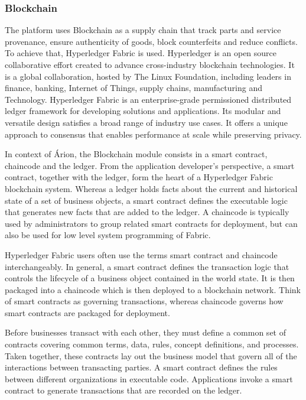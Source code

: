 \subsubsection{Blockchain}\label{sec:DataStorageBlockchain}
The platform uses Blockchain as a supply chain that track parts and service provenance, ensure authenticity of goods, block counterfeits and reduce conflicts. To achieve that, Hyperledger Fabric is used. Hyperledger is an open source collaborative effort created to advance cross-industry blockchain technologies. It is a global collaboration, hosted by The Linux Foundation, including leaders in finance, banking, Internet of Things, supply chains, manufacturing and Technology.
Hyperledger Fabric is an enterprise-grade permissioned distributed ledger framework for developing solutions and applications. Its modular and versatile design satisfies a broad range of industry use cases. It offers a unique approach to consensus that enables performance at scale while preserving privacy.

In context of Árion, the Blockchain module consists in a smart contract, chaincode and the ledger. From the application developer’s perspective, a smart contract, together with the ledger, form the heart of a Hyperledger Fabric blockchain system. Whereas a ledger holds facts about the current and historical state of a set of business objects, a smart contract defines the executable logic that generates new facts that are added to the ledger. A chaincode is typically used by administrators to group related smart contracts for deployment, but can also be used for low level system programming of Fabric.

Hyperledger Fabric users often use the terms smart contract and chaincode interchangeably. In general, a smart contract defines the transaction logic that controls the lifecycle of a business object contained in the world state. It is then packaged into a chaincode which is then deployed to a blockchain network. Think of smart contracts as governing transactions, whereas chaincode governs how smart contracts are packaged for deployment.

Before businesses transact with each other, they must define a common set of contracts covering common terms, data, rules, concept definitions, and processes. Taken together, these contracts lay out the business model that govern all of the interactions between transacting parties. A smart contract defines the rules between different organizations in executable code. Applications invoke a smart contract to generate transactions that are recorded on the ledger.

